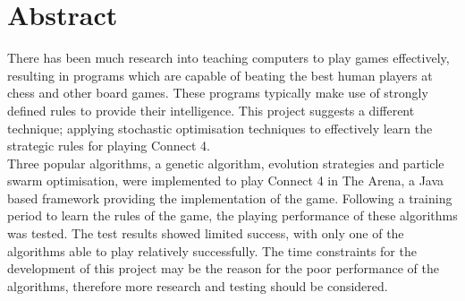 \chapter*{Abstract}

There has been much research into teaching computers to play games effectively, resulting in programs which are capable of beating the best human players at chess and other board games. These programs typically make use of strongly defined rules to provide their intelligence. This project suggests a different technique; applying stochastic optimisation techniques to effectively learn the strategic rules for playing Connect 4.
\\Three popular algorithms, a genetic algorithm, evolution strategies and particle swarm optimisation, were implemented to play Connect 4 in The Arena, a Java based framework providing the implementation of the game. Following a training period to learn the rules of the game, the playing performance of these algorithms was tested. The test results showed limited success, with only one of the algorithms able to play relatively successfully. The time constraints for the development of this project may be the reason for the poor performance of the algorithms, therefore more research and testing should be considered.
